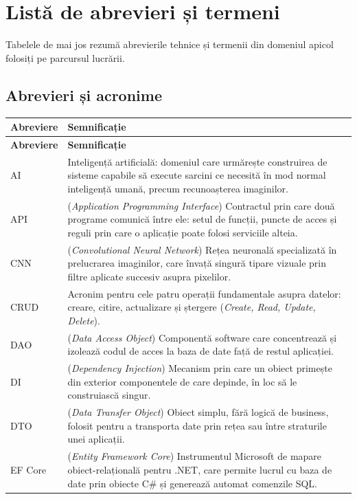 \chapter*{Listă de abrevieri și termeni}

Tabelele de mai jos rezumă abrevierile tehnice și termenii din domeniul apicol folosiți pe parcursul lucrării.

\section*{Abrevieri și acronime}

\begin{longtable}{@{}p{2.6cm} p{10.6cm}@{}}
\textbf{Abreviere} & \textbf{Semnificație} \\
\hline
\endfirsthead
\textbf{Abreviere} & \textbf{Semnificație} \\
\hline
\endhead
AI & Inteligență artificială: domeniul care urmărește construirea de sisteme capabile să execute sarcini ce necesită în mod normal inteligență umană, precum recunoașterea imaginilor. \\
API & (\textit{Application Programming Interface}) Contractul prin care două programe comunică între ele: setul de funcții, puncte de acces și reguli prin care o aplicație poate folosi serviciile alteia. \\
CNN & (\textit{Convolutional Neural Network}) Rețea neuronală specializată în prelucrarea imaginilor, care învață singură tipare vizuale prin filtre aplicate succesiv asupra pixelilor. \\
CRUD & Acronim pentru cele patru operații fundamentale asupra datelor: creare, citire, actualizare și ștergere (\textit{Create, Read, Update, Delete}). \\
DAO & (\textit{Data Access Object}) Componentă software care concentrează și izolează codul de acces la baza de date față de restul aplicației. \\
DI & (\textit{Dependency Injection}) Mecanism prin care un obiect primește din exterior componentele de care depinde, în loc să le construiască singur. \\
DTO & (\textit{Data Transfer Object}) Obiect simplu, fără logică de business, folosit pentru a transporta date prin rețea sau între straturile unei aplicații. \\
EF Core & (\textit{Entity Framework Core}) Instrumentul Microsoft de mapare obiect-relațională pentru .NET, care permite lucrul cu baza de date prin obiecte C\# și generează automat comenzile SQL. \\

\end{longtable}
